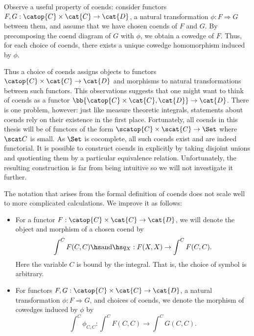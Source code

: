 Observe a useful property of coends: consider functors
$F,G:\catop{C}\times\cat{C}\to\cat{D}$, a natural transformation
$\phi:F\Rightarrow G$ between them, and assume that we have chosen coends of $F$
and $G$. By precomposing the coend diagram of $G$ with $\phi$, we obtain a
cowedge of $F$. Thus, for each choice of coends, there exists a unique cowedge
homomorphism induced by $\phi$.

Thus a choice of coends assigns objects to functors $\catop{C}\times\cat{C}\to\cat{D}$
and morphisms to natural transformations between such functors. This
observations suggests that one might want to think of coends as a functor
$\bb{\catop{C}\times\cat{C},\cat{D}}\to\cat{D}$. There is one problem, however:
just like measure theoretic integrals, statements about coends rely on their
existence in the first place. Fortunately, all coends in this thesis will be of
functors of the form $\scatop{C}\times\scat{C}\to\Set$ where $\scat C$ is
small. As $\Set$ is cocomplete, all such coends exist and are indeed
functorial. It is possible to construct coends in \Set{} explicitly by taking
disjoint unions and quotienting them by a particular equivalence relation.
Unfortunately, the resulting construction is far from being intuitive so we
will not investigate it further.

\begin{notation}
  The notation that arises from the formal definition of coends does not scale
  well to more complicated calculations. We improve it as follows:
  \begin{itemize}
    \item For a functor $F:\catop{C}\times\cat{C}\to\cat{D}$, we will denote the
      object and morphism of a chosen coend by
      \begin{align}\label{eq:coend_integral_notation}
        \int^{C} F(C,C) \hs\text{and}\hs q_X:F(X,X)\to\int^C F(C,C).
      \end{align}
      Here the variable $C$ is bound by the integral. That is, the choice of
      symbol is arbitrary.
    \item For functors $F,G:\catop{C}\times\cat{C}\to\cat{D}$, a natural
      transformation $\phi: F\Rightarrow G$, and choices of coends, we denote
      the morphism of cowedges induced by $\phi$ by
      \begin{equation}\label{eq:coend_natural_transformation}
        \int^C \phi_{C,C} : \int^C F(C,C) \to \int^C G(C,C).
      \end{equation}
  \end{itemize}
\end{notation}


